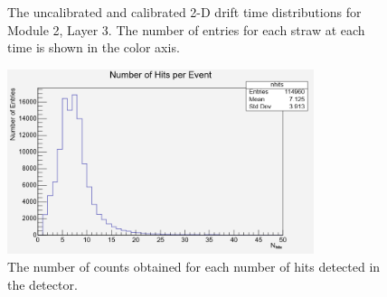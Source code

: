\documentclass[a4paper]{report}
\numberwithin{equation}{section}
\begin{document}
\begin{figure}[htb!]
	\centering
	\quad
	\centering
	\caption{The uncalibrated and calibrated 2-D drift time 
	distributions for Module 2, Layer 3. The number of entries for each straw at each time is shown in the 
	color axis.}
	\label{fig:calib_drift2d_m2l3}
\end{figure}

\begin{figure}[!h]
	\centering
	\includegraphics[width=0.8\textwidth]{nhits.png}
	\caption{The number of counts obtained for each number of hits detected in the detector. }
	\label{fig:nhits}
\end{figure} \par
\end{document}
